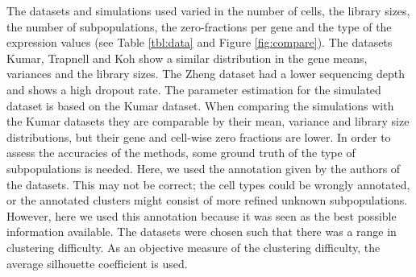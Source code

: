 \documentclass[12pt, a4paper]{article}\usepackage[]{graphicx}\usepackage[]{color}
\begin{document}
The datasets and simulations used varied in the number of cells, the library sizes, the number of subpopulations, the zero-fractions per gene and the type of the expression values (see Table \ref{tbl:data} and Figure \ref{fig:compare}). 
The datasets Kumar, Trapnell and Koh show a similar distribution in the gene means, variances and the library sizes. The Zheng dataset had a lower sequencing depth and shows a high dropout rate. The parameter estimation for the simulated dataset is based on the Kumar dataset. When comparing the simulations with the Kumar datasets they are comparable by their mean, variance and library size distributions, but their gene and cell-wise zero fractions are lower. 
In order to assess the accuracies of the methods, some ground truth of the type of subpopulations is needed. Here, we used the annotation given by the authors of the datasets. This may not be correct; the cell types could be wrongly annotated, or the annotated clusters might consist of more refined unknown subpopulations. However, here we used this annotation because it was seen as the best possible information available. The datasets were chosen such that there was a range in clustering difficulty. As an objective measure of the clustering difficulty, the average silhouette coefficient is used. 
\end{document}
